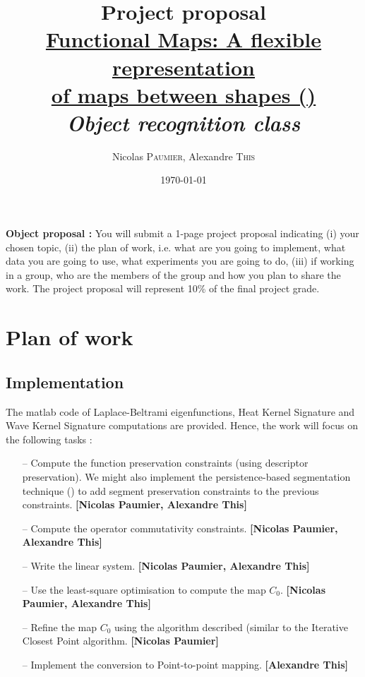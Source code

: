 \documentclass{article}
\title{Project proposal \\ \underline{Functional Maps: A flexible representation }\\ \underline{of maps between shapes (\cite{ovsjanikov2012functional})}\\ \textit{Object recognition class}} %
\author{Nicolas \textsc{Paumier}, Alexandre \textsc{This}} %
\date{\today} %
\begin{document}
\maketitle %



\setlength\parindent{0pt} %

\renewcommand{\labelenumi}{\alph{enumi}.} %

\vspace{3cm}
\textbf{Object proposal : } You will submit a 1-page project proposal indicating (i) your chosen topic, (ii) the plan of work, i.e. what are you going to implement, what data you are going to use, what experiments you are going to do, (iii) if working in a group, who are the members of the group and how you plan to share the work. The project proposal will represent 10\% of the final project grade.

\tableofcontents

\newpage

\section{Plan of work}
\subsection{Implementation}
The matlab code of Laplace-Beltrami eigenfunctions, Heat Kernel Signature and Wave Kernel Signature computations are provided. Hence, the work will focus on the following tasks :

\begin{itemize}
\item[--]{Compute the function preservation constraints (using descriptor preservation). We might also implement the persistence-based segmentation technique (\cite{skraba2010persistence}) to add segment preservation constraints to the previous constraints. \textbf{[Nicolas Paumier, Alexandre This]}}
\item[--]{Compute the operator commutativity constraints. \textbf{[Nicolas Paumier, Alexandre This]}}
\item[--]{Write the linear system. \textbf{[Nicolas Paumier, Alexandre This]}}
\item[--]{Use the least-square optimisation to compute the map $C_{0}$. \textbf{[Nicolas Paumier, Alexandre This]}}
\item[--]{Refine the map $C_{0}$ using the algorithm described (similar to the Iterative Closest Point algorithm. \textbf{[Nicolas Paumier]}}
\item[--]{Implement the conversion to Point-to-point mapping. \textbf{[Alexandre This]}}
\end{itemize}
\end{document}
